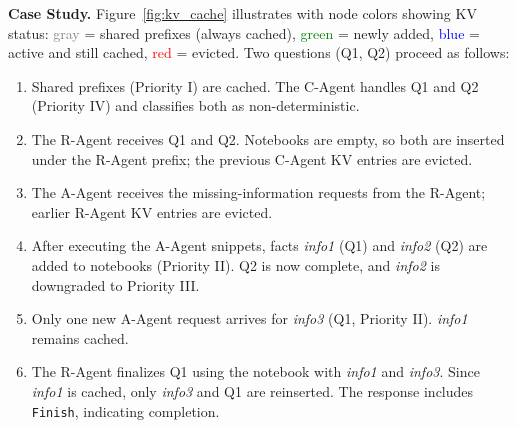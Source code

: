 \textbf{Case Study.}
Figure~\ref{fig:kv_cache} illustrates \projectname with node colors showing KV status:
\textcolor{gray}{gray} = shared prefixes (always cached),
\textcolor{green}{green} = newly added,
\textcolor{blue}{blue} = active and still cached,
\textcolor{red}{red} = evicted.
Two questions (Q1, Q2) proceed as follows:
\begin{enumerate}[leftmargin=*,  nosep]
  \item Shared prefixes (Priority I) are cached. The C-Agent handles Q1 and Q2 (Priority IV) and classifies both as non-deterministic.
  \item The R-Agent receives Q1 and Q2. Notebooks are empty, so both are inserted under the R-Agent prefix; the previous C-Agent KV entries are evicted.
  \item The A-Agent receives the missing-information requests from the R-Agent; earlier R-Agent KV entries are evicted.
  \item After executing the A-Agent snippets, facts \textit{info1} (Q1) and \textit{info2} (Q2) are added to notebooks (Priority II). Q2 is now complete, and \textit{info2} is downgraded to Priority III.
  \item Only one new A-Agent request arrives for \textit{info3} (Q1, Priority II). \textit{info1} remains cached.
  \item The R-Agent finalizes Q1 using the notebook with \textit{info1} and \textit{info3}. Since \textit{info1} is cached, only \textit{info3} and Q1 are reinserted. The response includes \texttt{Finish}, indicating completion.
\end{enumerate}

